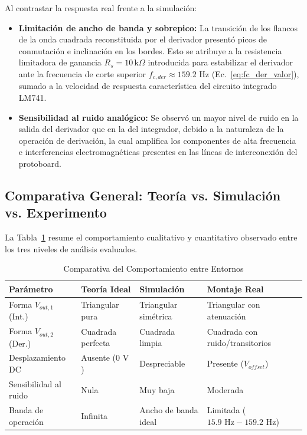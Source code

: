 \documentclass[conference]{IEEEtran}
\begin{document}
Al contrastar la respuesta real frente a la simulación:
\begin{itemize}
    \item \textbf{Limitación de ancho de banda y sobrepico:} La transición de los flancos de la onda cuadrada reconstituida por el derivador presentó picos de conmutación e inclinación en los bordes. Esto se atribuye a la resistencia limitadora de ganancia $R_s = 10\,\text{k}\Omega$ introducida para estabilizar el derivador ante la frecuencia de corte superior $f_{c,der} \approx 159.2\text{ Hz}$ (Ec.~\eqref{eq:fc_der_valor}), sumado a la velocidad de respuesta característica del circuito integrado LM741.
    \item \textbf{Sensibilidad al ruido analógico:} Se observó un mayor nivel de ruido en la salida del derivador que en la del integrador, debido a la naturaleza de la operación de derivación, la cual amplifica los componentes de alta frecuencia e interferencias electromagnéticas presentes en las líneas de interconexión del protoboard.
\end{itemize}

\subsection{Comparativa General: Teoría vs. Simulación vs. Experimento}
La Tabla~\ref{tab:comparativa} resume el comportamiento cualitativo y cuantitativo observado entre los tres niveles de análisis evaluados.

\begin{table}[htbp]
\caption{Comparativa del Comportamiento entre Entornos}
\label{tab:comparativa}
\centering
\begin{tabular}{p{2.2cm} p{1.8cm} p{1.8cm} p{1.8cm}}
\hline
\textbf{Parámetro} & \textbf{Teoría Ideal} & \textbf{Simulación} & \textbf{Montaje Real} \\
\hline
Forma $V_{out,1}$ (Int.) & Triangular pura & Triangular simétrica & Triangular con atenuación \\
Forma $V_{out,2}$ (Der.) & Cuadrada perfecta & Cuadrada limpia & Cuadrada con ruido/transitorios \\
Desplazamiento DC & Ausente ($0\text{ V}$) & Despreciable & Presente ($V_{offset}$) \\
Sensibilidad al ruido & Nula & Muy baja & Moderada \\
Banda de operación & Infinita & Ancho de banda ideal & Limitada ($15.9\text{ Hz} - 159.2\text{ Hz}$) \\
\hline
\end{tabular}
\end{table}
\end{document}
